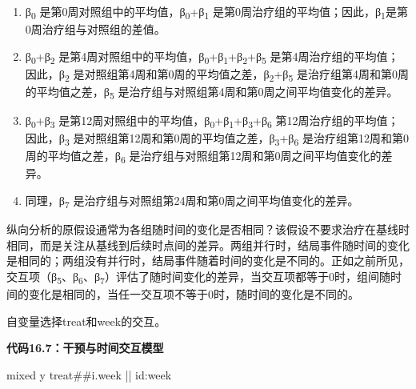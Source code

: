 \documentclass[
  chinese-hans,
  letterpaper,
  DIV=11,
  numbers=noendperiod]{scrreprt}
\newenvironment{Shaded}{\begin{snugshade}}{\end{snugshade}}
\newcommand{\FunctionTok}[1]{\textcolor[rgb]{0.28,0.35,0.67}{#1}}
\newcommand{\NormalTok}[1]{\textcolor[rgb]{0.00,0.23,0.31}{#1}}
\begin{document}
\begin{enumerate}
\def\labelenumi{\arabic{enumi})}
\item
  β\textsubscript{0}
  是第0周对照组中的平均值，β\textsubscript{0}+β\textsubscript{1}
  是第0周治疗组的平均值；因此，β\textsubscript{1}是第0周治疗组与对照组的差值。
\item
  β\textsubscript{0}+β\textsubscript{2}
  是第4周对照组中的平均值，β\textsubscript{0}+β\textsubscript{1}+β\textsubscript{2}+β\textsubscript{5}
  是第4周治疗组的平均值；因此，β\textsubscript{2}
  是对照组第4周和第0周的平均值之差，β\textsubscript{2}+β\textsubscript{5}
  是治疗组第4周和第0周的平均值之差，β\textsubscript{5}
  是治疗组与对照组第4周和第0周之间平均值变化的差异。
\item
  β\textsubscript{0}+β\textsubscript{3}
  是第12周对照组中的平均值，β\textsubscript{0}+β\textsubscript{1}+β\textsubscript{3}+β\textsubscript{6}
  第12周治疗组的平均值；因此，β\textsubscript{3}
  是对照组第12周和第0周的平均值之差，β\textsubscript{3}+β\textsubscript{6}
  是治疗组第12周和第0周的平均值之差，β\textsubscript{6}
  是治疗组与对照组第12周和第0周之间平均值变化的差异。
\item
  同理，β\textsubscript{7}
  是治疗组与对照组第24周和第0周之间平均值变化的差异。
\end{enumerate}

纵向分析的原假设通常为各组随时间的变化是否相同？该假设不要求治疗在基线时相同，而是关注从基线到后续时点间的差异。两组并行时，结局事件随时间的变化是相同的；两组没有并行时，结局事件随着时间的变化是不同的。正如之前所见，交互项（β\textsubscript{5}、β\textsubscript{6}、β\textsubscript{7}）评估了随时间变化的差异，当交互项都等于0时，组间随时间的变化是相同的，当任一交互项不等于0时，随时间的变化是不同的。

自变量选择treat和week的交互。

\begin{tcolorbox}[enhanced jigsaw, arc=.35mm, bottomrule=.15mm, breakable, colback=white, colframe=quarto-callout-note-color-frame, left=2mm, leftrule=.75mm, opacityback=0, rightrule=.15mm, toprule=.15mm]

\vspace{-3mm}\textbf{代码16.7：干预与时间交互模型}\vspace{3mm}

\begin{Shaded}
\begin{Highlighting}[]
\NormalTok{mixed }\FunctionTok{y}\NormalTok{ treat\#\#i.}\FunctionTok{week}\NormalTok{ || id:}\FunctionTok{week}
\end{Highlighting}
\end{Shaded}

\end{tcolorbox}
\end{document}
